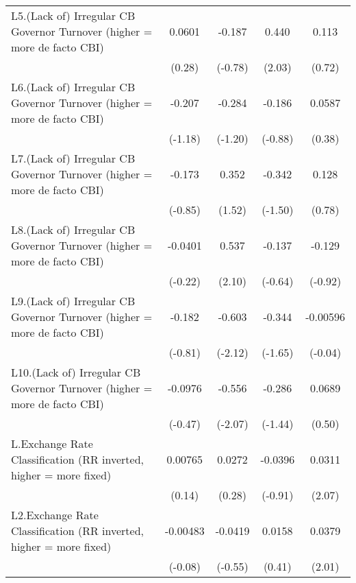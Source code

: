 {\begin{longtable}{l*{4}{c}}
\addlinespace
L5.(Lack of) Irregular CB Governor Turnover (higher = more de facto CBI)&   0.0601         &   -0.187         &    0.440\sym{*}  &    0.113         \\
                &   (0.28)         &  (-0.78)         &   (2.03)         &   (0.72)         \\
\addlinespace
L6.(Lack of) Irregular CB Governor Turnover (higher = more de facto CBI)&   -0.207         &   -0.284         &   -0.186         &   0.0587         \\
                &  (-1.18)         &  (-1.20)         &  (-0.88)         &   (0.38)         \\
\addlinespace
L7.(Lack of) Irregular CB Governor Turnover (higher = more de facto CBI)&   -0.173         &    0.352         &   -0.342         &    0.128         \\
                &  (-0.85)         &   (1.52)         &  (-1.50)         &   (0.78)         \\
\addlinespace
L8.(Lack of) Irregular CB Governor Turnover (higher = more de facto CBI)&  -0.0401         &    0.537\sym{*}  &   -0.137         &   -0.129         \\
                &  (-0.22)         &   (2.10)         &  (-0.64)         &  (-0.92)         \\
\addlinespace
L9.(Lack of) Irregular CB Governor Turnover (higher = more de facto CBI)&   -0.182         &   -0.603\sym{*}  &   -0.344         & -0.00596         \\
                &  (-0.81)         &  (-2.12)         &  (-1.65)         &  (-0.04)         \\
\addlinespace
L10.(Lack of) Irregular CB Governor Turnover (higher = more de facto CBI)&  -0.0976         &   -0.556\sym{*}  &   -0.286         &   0.0689         \\
                &  (-0.47)         &  (-2.07)         &  (-1.44)         &   (0.50)         \\
\addlinespace
L.Exchange Rate Classification (RR inverted, higher = more fixed)&  0.00765         &   0.0272         &  -0.0396         &   0.0311\sym{*}  \\
                &   (0.14)         &   (0.28)         &  (-0.91)         &   (2.07)         \\
\addlinespace
L2.Exchange Rate Classification (RR inverted, higher = more fixed)& -0.00483         &  -0.0419         &   0.0158         &   0.0379\sym{*}  \\
                &  (-0.08)         &  (-0.55)         &   (0.41)         &   (2.01)         \\

\end{longtable}}
